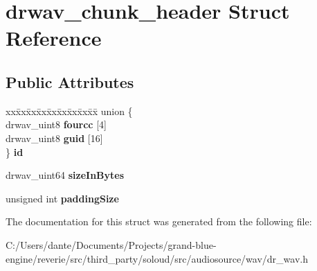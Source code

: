 \hypertarget{structdrwav__chunk__header}{}\section{drwav\+\_\+chunk\+\_\+header Struct Reference}
\label{structdrwav__chunk__header}
\subsection*{Public Attributes}
\begin{DoxyCompactItemize}
\item 
\mbox{\label{structdrwav__chunk__header_ab50fc5cb3306ad858ac0ee69cb03daa9}} 
\begin{tabbing}
xx\=xx\=xx\=xx\=xx\=xx\=xx\=xx\=xx\=\kill
union \{\\
\>drwav\_uint8 {\bfseries fourcc} \mbox{[}4\mbox{]}\\
\>drwav\_uint8 {\bfseries guid} \mbox{[}16\mbox{]}\\
\} {\bfseries id}\\

\end{tabbing}\item 
\mbox{\label{structdrwav__chunk__header_aa1cb86d096c1402276dabaab65c76cd2}} 
drwav\+\_\+uint64 {\bfseries size\+In\+Bytes}
\item 
\mbox{\label{structdrwav__chunk__header_ad9da64cda7715e1a7714c30b4e2e91a2}} 
unsigned int {\bfseries padding\+Size}
\end{DoxyCompactItemize}


The documentation for this struct was generated from the following file\+:\begin{DoxyCompactItemize}
\item 
C\+:/\+Users/dante/\+Documents/\+Projects/grand-\/blue-\/engine/reverie/src/third\+\_\+party/soloud/src/audiosource/wav/dr\+\_\+wav.\+h\end{DoxyCompactItemize}
